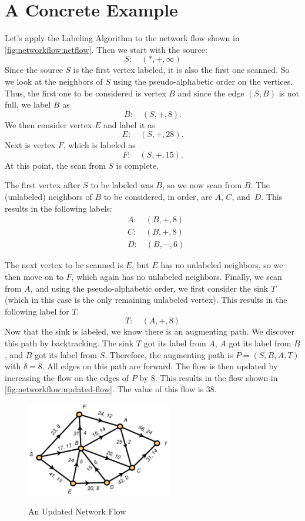 \section{A Concrete Example}\label{s:networkflow:example}

Let's apply the Labeling Algorithm to the network flow shown in
\autoref{fig:networkflow:netflow}.  Then we start with the source:
\[
    S:\quad(*,+,\infty)
\]
Since the source $S$ is the first vertex labeled, it is also the first
one scanned.  So we look at the neighbors of $S$ using the
pseudo-alphabetic order on the vertices. Thus, the first one to be
considered is vertex $B$ and since the edge $(S,B)$ is not full, we
label $B$ as
\[
   B:\quad(S,+,8).
\]
We then consider vertex $E$ and label it as
\[
   E:\quad(S,+,28).
\]
Next is vertex $F$, which is labeled as
\[
   F:\quad(S,+,15).
\]
At this point, the scan from $S$ is complete. 

The first vertex after $S$ to be labeled was $B$, so we now scan from
$B$.  The (unlabeled) neighbors of $B$ to be considered, in order, are
$A$, $C$, and~$D$.  This results in the following labels:
\begin{align*}
  &A:\quad(B,+,8)\\
  &C:\quad(B,+,8)\\
  &D:\quad(B,-,6)
\end{align*} 

The next vertex to be scanned is $E$, but $E$ has no unlabeled
neighbors, so we then move on to $F$, which again has no unlabeled
neighbors.  Finally, we scan from $A$, and using the pseudo-alphabetic
order, we first consider the sink $T$ (which in this case is the only
remaining unlabeled vertex).  This results in the following label for
$T$.
\[
  T:\quad(A,+,8)
\]
Now that the sink is labeled, we know there is an augmenting path.  We
discover this path by backtracking.  The sink $T$ got its label from
$A$, $A$ got its label from $B$, and $B$ got its label from $S$.
Therefore, the augmenting path is $P=(S,B,A,T)$ with $\delta=8$.  All
edges on this path are forward.  The flow is then updated by
increasing the flow on the edges of $P$ by $8$.  This results in the
flow shown in \autoref{fig:networkflow:updated-flow}.  The value of
this flow is $38$.

\begin{figure}
\begin{center}
\includegraphics*[width=2.5in]{networkflow-figs/webfig-31c}\\
\caption{An Updated Network Flow}\label{fig:networkflow:updated-flow}
\end{center}
\end{figure}

